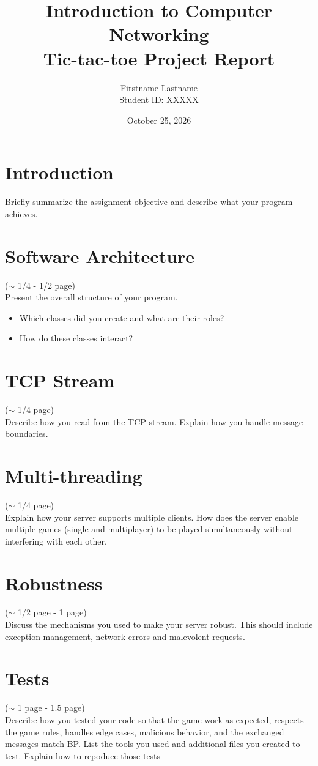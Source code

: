 \documentclass[11pt]{article}
\title{Introduction to Computer Networking\\Tic-tac-toe Project Report}
\author{Firstname Lastname \\ Student ID: XXXXX}
\date{October 25, 2026}
\begin{document}
\maketitle

\section{Introduction}
Briefly summarize the assignment objective and describe what your program achieves.

\section{Software Architecture }

($\sim$  1/4 - 1/2 page)\\

Present the overall structure of your program. 
\begin{itemize}
    \item Which classes did you create and what are their roles?
    \item How do these classes interact?
\end{itemize}

\section{TCP Stream}
($\sim$  1/4 page)\\
Describe how you read from the TCP stream.  
Explain how you handle message boundaries.

\section{Multi-threading}
($\sim$  1/4 page)\\
Explain how your server supports multiple clients.  
How does the server enable multiple games (single and multiplayer) to be played simultaneously without interfering with each other.

\section{Robustness}
($\sim$  1/2 page - 1 page)\\
Discuss the mechanisms you used to make your server robust. This should include exception management, network errors and malevolent requests.

\section{Tests}
($\sim$  1 page - 1.5 page)\\
Describe how you tested your code so that the game work as expected, respects
the game rules, handles edge cases, malicious behavior, and the exchanged messages match BP. List the tools you used and additional files you created to test. Explain how to repoduce those tests
\end{document}

